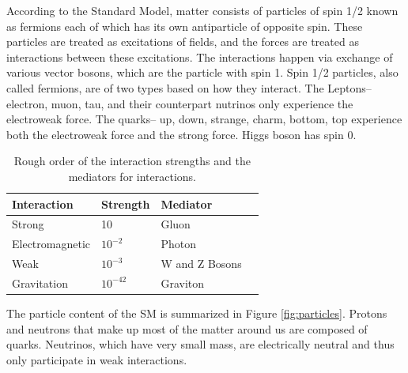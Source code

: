 According to the Standard Model, matter consists of particles of spin 1/2 known as fermions each of which has its own antiparticle of opposite spin. These particles are treated as excitations of fields, and the forces are treated as interactions between these excitations. The interactions happen via exchange of various vector bosons, which are the particle with spin 1. Spin 1/2 particles, also called fermions, are of two types based on how they interact.  The Leptons--electron, muon, tau, and their counterpart nutrinos only experience the electroweak force. The quarks-- up, down, strange, charm, bottom, top experience both the electroweak force and the strong force. Higgs boson has spin 0.


\begin{table}
\begin{center}
    \begin{tabular}{| l | l | l | l |}
    \hline
    {\bf Interaction} & {\bf Strength} & {\bf Mediator} \\ \hline
    Strong & 10  & Gluon \\ \hline
    Electromagnetic & $10^{-2}$  & Photon \\ \hline
    Weak & $10^{-3}$ &   W and Z Bosons\\ \hline
    Gravitation & $10^{-42}$  & Graviton \\
    \hline
    \end{tabular}
	\captionsetup{format=hang}
     \caption{Rough order of the interaction strengths and the mediators for interactions.}

\end{center}
\end{table}


The particle content of the SM is summarized in Figure \ref{fig:particles}. Protons and neutrons that make up most of the matter around us are composed of quarks.  Neutrinos, which have very small mass, are electrically neutral and thus only participate in weak interactions.



